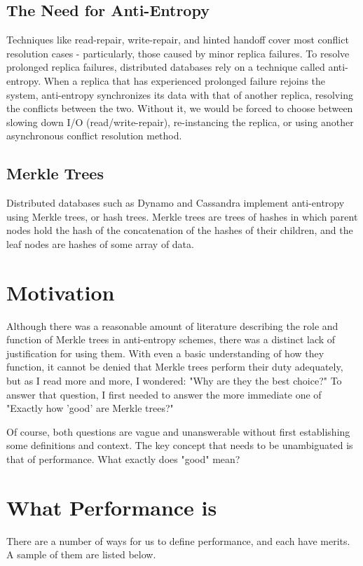 \documentclass[11pt,letterpaper]{article}
\begin{document}
\subsection{The Need for Anti-Entropy}
Techniques like read-repair, write-repair, and hinted handoff cover most conflict resolution cases - particularly, those caused by minor replica failures. To resolve prolonged replica failures, distributed databases rely on a technique called anti-entropy. When a replica that has experienced prolonged failure rejoins the system, anti-entropy synchronizes its data with that of another replica, resolving the conflicts between the two. Without it, we would be forced to choose between slowing down I/O (read/write-repair), re-instancing the replica, or using another asynchronous conflict resolution method.

\subsection{Merkle Trees}
Distributed databases such as Dynamo and Cassandra implement anti-entropy using Merkle trees, or hash trees. Merkle trees are trees of hashes in which parent nodes hold the hash of the concatenation of the hashes of their children, and the leaf nodes are hashes of some array of data.

\section{Motivation}
Although there was a reasonable amount of literature describing the role and function of Merkle trees in anti-entropy schemes, there was a distinct lack of justification for using them. With even a basic understanding of how they function, it cannot be denied that Merkle trees perform their duty adequately, but as I read more and more, I wondered: "Why are they the best choice?" To answer that question, I first needed to answer the more immediate one of "Exactly how 'good' are Merkle trees?"

Of course, both questions are vague and unanswerable without first establishing some definitions and context. The key concept that needs to be unambiguated is that of performance. What exactly does "good" mean?

\section{What Performance is}
There are a number of ways for us to define performance, and each have merits. A sample of them are listed below.
\end{document}
